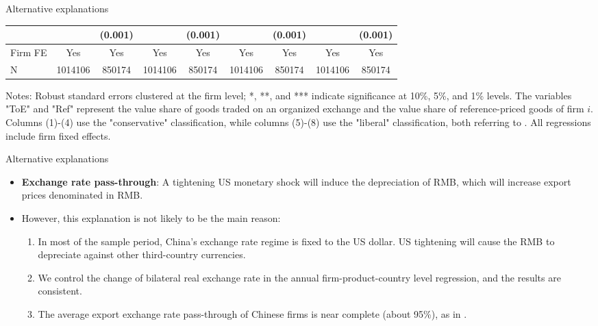 \documentclass[10pt]{beamer}
\begin{document}
\begin{frame}{Alternative explanations}
\begin{table}[htbp]
{\begin{threeparttable}
\begin{tabular}{lcccccccc}
              &       & (0.001) &       & (0.001) &       & (0.001) &       & (0.001) \\
        \midrule
        Firm FE & Yes   & Yes   & Yes   & Yes   & Yes   & Yes   & Yes   & Yes \\
        N     & 1014106 & 850174 & 1014106 & 850174 & 1014106 & 850174 & 1014106 & 850174 \\
            \bottomrule
        \end{tabular}
            \begin{tablenotes}
                \footnotesize
                \item Notes: Robust standard errors clustered at the firm level;  *, **, and *** indicate significance at 10\%, 5\%, and 1\% levels. The variables "ToE" and "Ref" represent the value share of goods traded on an organized exchange and the value share of reference-priced goods of firm $i$. Columns (1)-(4) use the "conservative" classification, while columns (5)-(8) use the "liberal" classification, both referring to \cite{rauch1999networks}. All regressions include firm fixed effects.
    	\end{tablenotes}
        \end{threeparttable}
        }
        \label{tab.rauch}
    \end{table}
\end{frame}

\begin{frame}[label=alt_erpt]{Alternative explanations}
    \begin{itemize}
        \item \textbf{Exchange rate pass-through}: A tightening US monetary shock will induce the depreciation of RMB, which will increase export prices denominated in RMB.
        \item However, this explanation is not likely to be the main reason:
        \begin{enumerate}
            \item In most of the sample period, China's exchange rate regime is fixed to the US dollar. US tightening will cause the RMB to depreciate against other third-country currencies.
            \item We control the change of bilateral real exchange rate in the annual firm-product-country level regression, and the results are consistent. \hyperlink{appendix_tab.altagg}{}
            \item The average export exchange rate pass-through of Chinese firms is near complete (about 95\%), as in \cite{li2015exchange}.
        \end{enumerate}
        
    \end{itemize}
\end{frame}
\end{document}
